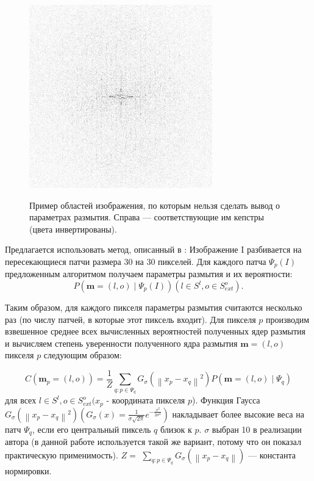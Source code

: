 \begin{figure}[H]
\begin{minipage}[h]{0.45\linewidth}
\end{minipage}
\hfill
\begin{minipage}[h]{0.45\linewidth}
\includegraphics[width=0.5\linewidth, left]{pics/synth_blur/i2.png} \\
\end{minipage}

\caption{Пример областей изображения, по которым нельзя сделать вывод о параметрах размытия. Справа --- соответствующие им кепстры (цвета инвертированы).}
\label{ris:bad_ceps}
\end{figure}

Предлагается использовать метод, описанный в \cite{sun}:
Изображение I разбивается на пересекающиеся патчи размера 30 на 30 пикселей. Для каждого патча $\Psi_{p}(I)$ предложенным алгоритмом получаем параметры размытия и их вероятности:
$$
P\left(\mathbf{m}=(l, o) \mid \Psi_{p}(I)\right)\left(l \in S^{l}, o \in S_{e x t}^{o}\right).
$$

Таким образом, для каждого пикселя параметры размытия считаются несколько раз (по числу патчей, в которые этот пиксель входит).
Для пикселя $p$ производим взвешенное среднее всех вычисленных вероятностей полученных ядер размытия и вычисляем степень уверенности полученного ядра размытия $\mathbf{m}=(l, o)$ пикселя $p$ следующим образом:

$$
C\left(\mathbf{m}_{p}=(l, o)\right)= \frac{1}{Z} \sum_{q: p \in \Psi_{q}} G_{\sigma}\left(\left\|x_{p}-x_{q}\right\|^{2}\right) P\left(\mathbf{m}=(l, o) \mid \Psi_{q}\right)
$$
для всех $l \in S^{l}, o \in S_{e x t}^{o} (x_{p}$ - координата пикселя $p$). Функция Гаусса $G_{\sigma}\left(\left\|x_{p}-x_{q}\right\|^{2}\right) (G_{\sigma}(x) = \frac{1}{\sigma \sqrt{2 \pi}} e^{-\frac{x^{2}}{2 \sigma^{2}}})$ накладывает более высокие веса на патч $\Psi_{q}$, если его центральный пиксель $q$ близок к $p$. $\sigma$ выбран 10 в реализации автора (в данной работе используется такой же вариант, потому что он показал практическую применимость). $Z=$ $\sum_{q: p \in \Psi_{q}} G_{\sigma}\left(\left\|x_{p}-x_{q}\right\|\right)$ --- константа нормировки.

